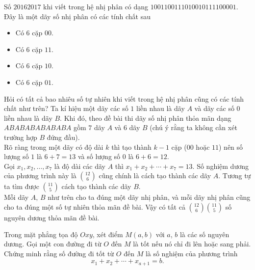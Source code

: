 \begin{bt}%
 Số $20162017$ khi viết trong hệ nhị phân có dạng $1001100111010010111100001$. Đây là một dãy số nhị phân có các tính chất sau
 \begin{itemize}
 	\item Có $6$ cặp $00$.
 	\item Có $6$ cặp $11$.
 	\item Có $6$ cặp $10$.
 	\item Có $6$ cặp $01$.
 \end{itemize}
 Hỏi có tất cả bao nhiêu số tự nhiên khi viết trong hệ nhị phân cũng có các tính chất như trên?
 \loigiai
 {
 Ta kí hiệu một dãy các số $1$ liền nhau là dãy $A$ và dãy các số $0$ liền nhau là dãy $B$. Khi đó, theo đề bài thi dãy số nhị phân thỏa mãn dạng $ABABABABABABA $ gồm $7$ dãy $A$ và $6$ dãy $B$ (chú ý rằng ta không cần xét trường hợp $B$ đứng đầu).\\
 Rõ ràng trong một dãy có độ dài $k$ thì tạo thành $k-1$ cặp ($00$ hoặc $11$) nên số lượng số $1$ là $6+7=13$ và số lượng số $0$ là $6+6=12$.\\
 Gọi $x_1, x_2, \ldots, x_7$ là độ dài các dãy $A$ thì $x_1+x_2+\cdots+x_7=13$. Số nghiệm dương của phương trình này là $\displaystyle\binom{12}{6}$ cũng chính là cách tạo thành các dãy $A$. Tương tự ta tìm được $\displaystyle\binom{11}{5}$ cách tạo thành các dãy $B$.\\
 Mỗi dãy $A$, $B$ như trên cho ta đúng một dãy nhị phân, và mỗi dãy nhị phân cũng cho ta đúng một số tự nhiên thỏa mãn đề bài. Vậy có tất cả $\displaystyle\binom{12}{6}\binom{11}{5}$ số nguyên dương thỏa mãn đề bài.
 }
\end{bt}

\begin{bt}\label{TH.34}%
 Trong mặt phẳng tọa độ $Oxy$, xét điểm $M(a,b)$ với $a$, $b$ là các số nguyên dương. Gọi một con đường đi từ $O$ đến $M$ là tốt nếu nó chỉ đi lên hoặc sang phải. Chứng minh rằng số đường đi tốt từ $O$ đến $M$ là số nghiệm của phương trình
		\[x_1+x_2+\cdots+x_{a+1}=b.\]
\end{bt}

